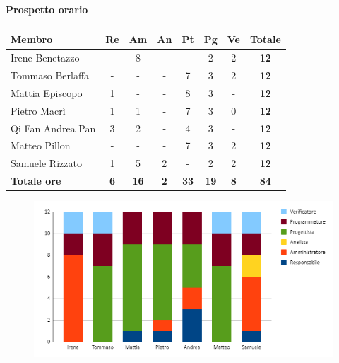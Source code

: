 \paragraph{Prospetto orario}
\begin{center}
	\renewcommand{\arraystretch}{1.8} %
	\begin{tabular}{ |m{10em}|c|c|c|c|c|c|c| }
	\hline
	\textbf{Membro} & \textbf{Re} & \textbf{Am} &  \textbf{An} &  \textbf{Pt} &  \textbf{Pg} &  \textbf{Ve} &  \textbf{Totale}\\
    \hline
    Irene Benetazzo   & - & 8 & - & - & 2 & 2 & \textbf{12} \\
    \hline
    Tommaso Berlaffa  & - & - & - & 7 & 3 & 2 & \textbf{12} \\
    \hline
    Mattia Episcopo   & 1 & - & - & 8 & 3 & - & \textbf{12} \\
    \hline
    Pietro Macrì      & 1 & 1 & - & 7 & 3 & 0 & \textbf{12} \\
    \hline
    Qi Fan Andrea Pan & 3 & 2 & - & 4 & 3 & - & \textbf{12} \\
    \hline
    Matteo Pillon     & - & - & - & 7 & 3 & 2 & \textbf{12} \\
    \hline
    Samuele Rizzato   & 1 & 5 & 2 & - & 2 & 2 & \textbf{12} \\
    \hline
    \textbf{Totale ore} & \textbf{6} & \textbf{16} &  \textbf{2} &  \textbf{33} &  \textbf{19} &  \textbf{8} &  \textbf{84}\\
    \hline
	\end{tabular}
\end{center}
\begin{figure}[H]
    \centering\includegraphics[width=\textwidth, height=\textheight,keepaspectratio]{images/preventivo/RTB-tecnologico-ore.png}
\end{figure}

